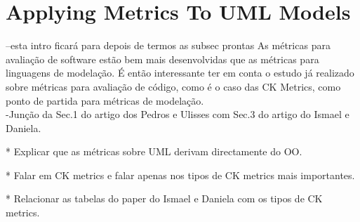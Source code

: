 \section{Applying Metrics To UML Models}\label{metrics}

--esta intro ficará para depois de termos as subsec prontas
As métricas para avaliação de  software estão bem mais desenvolvidas que as métricas para linguagens de modelação. É então interessante ter em conta o estudo já realizado sobre métricas para avaliação de código, como é o caso das CK Metrics, como ponto de partida para métricas de modelação.\\

-Junção da Sec.1 do artigo dos Pedros e Ulisses com Sec.3 do artigo do Ismael e Daniela.

    * Explicar que as métricas sobre UML derivam directamente do OO.

    * Falar em CK metrics e falar apenas nos tipos de CK metrics mais importantes.

    * Relacionar as tabelas do paper do Ismael e Daniela com os tipos de CK metrics.









